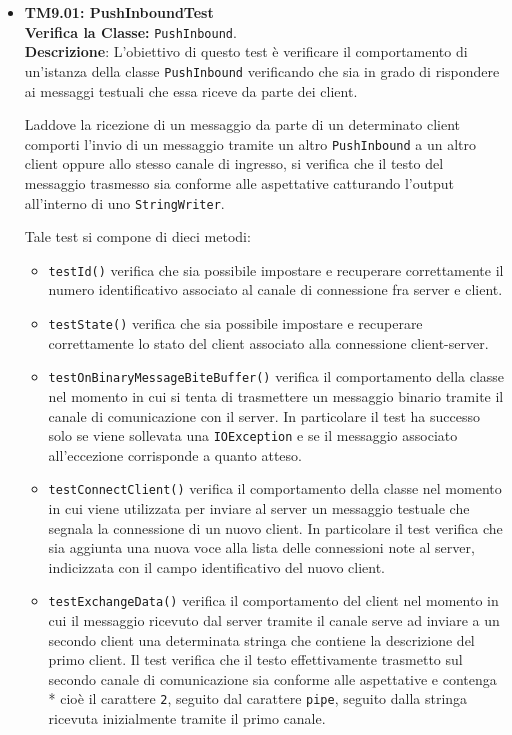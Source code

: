 \begin{itemize}

\item[\passed] \textbf{TM9.01: PushInboundTest}\\
\textbf{Verifica la Classe:} \texttt{PushInbound}.\\
\textbf{Descrizione}: L'obiettivo di questo test è verificare il comportamento di un'istanza della classe \texttt{PushInbound} verificando che sia in grado di rispondere ai messaggi testuali che essa riceve da parte dei client.

Laddove la ricezione di un messaggio da parte di un determinato client comporti l'invio di un messaggio tramite un altro \texttt{PushInbound} a un altro client oppure allo stesso canale di ingresso, si verifica che il testo del messaggio trasmesso sia conforme alle aspettative catturando l'output all'interno di uno \texttt{StringWriter}.
 
Tale test si compone di dieci metodi:
\begin{itemize}

\item \texttt{testId()} verifica che sia possibile impostare e recuperare correttamente il numero identificativo associato al canale di connessione fra server e client.

\item \texttt{testState()} verifica che sia possibile impostare e recuperare correttamente lo stato del client associato alla connessione client-server.

\item \texttt{testOnBinaryMessageBiteBuffer()} verifica il comportamento della classe nel momento in cui si tenta di trasmettere un messaggio binario tramite il canale di comunicazione con il server. In particolare il test ha successo solo se viene sollevata una \texttt{IOException} e se il messaggio associato all'eccezione corrisponde a quanto atteso.

\item \texttt{testConnectClient()} verifica il comportamento della classe nel momento in cui viene  utilizzata per inviare al server un messaggio testuale che segnala la connessione di un nuovo client. In particolare il test verifica che sia aggiunta una nuova voce alla lista delle connessioni note al server, indicizzata con il campo identificativo del nuovo client.

\item \texttt{testExchangeData()} verifica il comportamento del client nel momento in cui il messaggio ricevuto dal server tramite il canale serve ad inviare a un secondo client una determinata stringa che contiene la descrizione del primo client. Il test verifica che il testo effettivamente trasmetto sul secondo canale di comunicazione sia conforme alle aspettative e contenga * cioè il carattere \texttt{2}, seguito dal carattere \texttt{pipe}, seguito dalla stringa ricevuta inizialmente tramite il primo canale.


\end{itemize}
\end{itemize}
